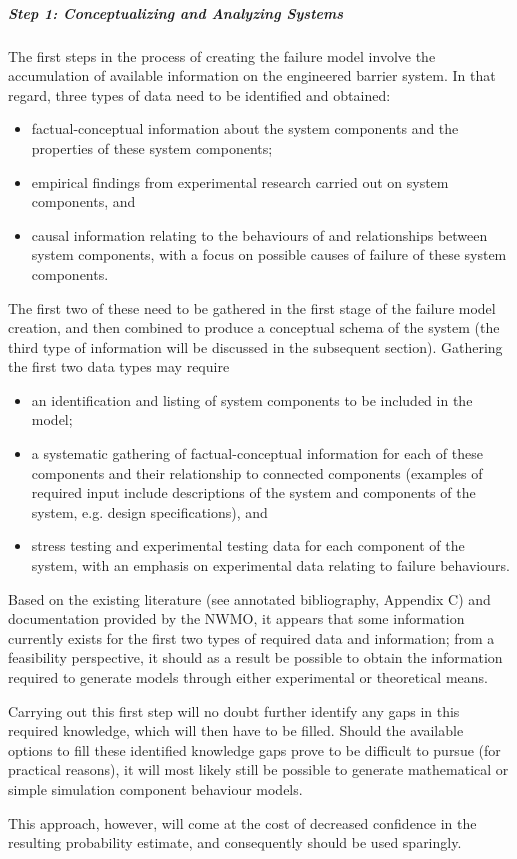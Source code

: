 \subparagraph*{Step 1: Conceptualizing and Analyzing Systems}
\label{sec:methodstep1}
The first steps in the process of creating the failure model involve the accumulation of available information on the engineered barrier system. In that regard, three types of data need to be identified and obtained:
\begin{itemize}[noitemsep]
\item factual-conceptual information about the system components and the properties of these system components;
\item empirical findings from experimental research carried out on system components, and
\item causal information relating to the behaviours of and relationships between system components, with a focus on possible causes of failure of these system components.
\end{itemize}
The first two of these need to be gathered in the first stage of the failure model creation, and then combined to produce a conceptual schema of the system (the third type of information will be discussed in the subsequent section). 
\newl
Gathering the first two data types may require
\begin{itemize}[noitemsep]
\item an identification and listing of system components to be included in the model;
\item a systematic gathering of factual-conceptual information for each of these components and their relationship to connected components (examples of required input include descriptions of the system and components of the system, e.g. design specifications), and
\item stress testing and experimental testing data for each component of the system, with an emphasis on experimental data relating to failure behaviours.
\end{itemize}
Based on the existing literature (see annotated bibliography, Appendix C) and documentation provided by the NWMO, it appears that some information currently exists for the first two types of required data and information; from a feasibility perspective, it should as a result be possible to obtain the information required to generate models through either experimental or theoretical means. \par Carrying out this first step will no doubt further identify any gaps in this required knowledge, which will then have to be filled. Should the available options to fill these identified knowledge gaps prove to be difficult to pursue (for practical reasons), it will most likely still be possible to generate mathematical or simple simulation component behaviour models. \par This approach, however, will come at the cost of decreased confidence in the resulting probability estimate, and consequently should be used sparingly.
